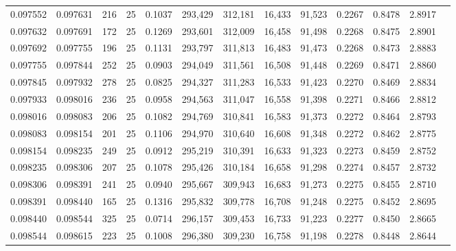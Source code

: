\begin{tabular}{rrrrrrrrrrrrr}
0.097552 & 0.097631 &   216 &  25 &                                     0.1037 & 293,429 & 312,181 &  16,433 &  91,523 & 0.2267 & 0.8478 & 2.8917 \\
0.097632 & 0.097691 &   172 &  25 &                                     0.1269 & 293,601 & 312,009 &  16,458 &  91,498 & 0.2268 & 0.8475 & 2.8901 \\
0.097692 & 0.097755 &   196 &  25 &                                     0.1131 & 293,797 & 311,813 &  16,483 &  91,473 & 0.2268 & 0.8473 & 2.8883 \\
0.097755 & 0.097844 &   252 &  25 &                                     0.0903 & 294,049 & 311,561 &  16,508 &  91,448 & 0.2269 & 0.8471 & 2.8860 \\
0.097845 & 0.097932 &   278 &  25 &                                     0.0825 & 294,327 & 311,283 &  16,533 &  91,423 & 0.2270 & 0.8469 & 2.8834 \\
0.097933 & 0.098016 &   236 &  25 &                                     0.0958 & 294,563 & 311,047 &  16,558 &  91,398 & 0.2271 & 0.8466 & 2.8812 \\
0.098016 & 0.098083 &   206 &  25 &                                     0.1082 & 294,769 & 310,841 &  16,583 &  91,373 & 0.2272 & 0.8464 & 2.8793 \\
0.098083 & 0.098154 &   201 &  25 &                                     0.1106 & 294,970 & 310,640 &  16,608 &  91,348 & 0.2272 & 0.8462 & 2.8775 \\
0.098154 & 0.098235 &   249 &  25 &                                     0.0912 & 295,219 & 310,391 &  16,633 &  91,323 & 0.2273 & 0.8459 & 2.8752 \\
0.098235 & 0.098306 &   207 &  25 &                                     0.1078 & 295,426 & 310,184 &  16,658 &  91,298 & 0.2274 & 0.8457 & 2.8732 \\
0.098306 & 0.098391 &   241 &  25 &                                     0.0940 & 295,667 & 309,943 &  16,683 &  91,273 & 0.2275 & 0.8455 & 2.8710 \\
0.098391 & 0.098440 &   165 &  25 &                                     0.1316 & 295,832 & 309,778 &  16,708 &  91,248 & 0.2275 & 0.8452 & 2.8695 \\
0.098440 & 0.098544 &   325 &  25 &                                     0.0714 & 296,157 & 309,453 &  16,733 &  91,223 & 0.2277 & 0.8450 & 2.8665 \\
0.098544 & 0.098615 &   223 &  25 &                                     0.1008 & 296,380 & 309,230 &  16,758 &  91,198 & 0.2278 & 0.8448 & 2.8644 \\

\end{tabular}
